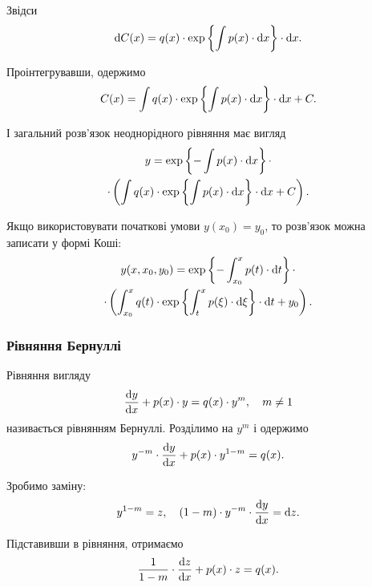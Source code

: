 Звідси
\begin{equation*} 
	\mathop{}\!\mathrm{d} C(x) = q(x) \cdot \exp \left\{\int p(x) \cdot \mathop{}\!\mathrm{d} x \right\} \cdot \mathop{}\!\mathrm{d} x.
\end{equation*}

Проінтегрувавши, одержимо
\begin{equation*} 
	C(x) = \int q(x) \cdot \exp \left\{\int p(x) \cdot \mathop{}\!\mathrm{d} x \right\} \cdot \mathop{}\!\mathrm{d} x + C.
\end{equation*}

І загальний розв’язок неоднорідного рівняння має вигляд
\begin{multline*} 
	y = \exp \left\{ - \int p(x) \cdot \mathop{}\!\mathrm{d} x \right\} \cdot \\
	\cdot \left( \int q(x) \cdot \exp \left\{\int p(x) \cdot \mathop{}\!\mathrm{d} x \right\} \cdot \mathop{}\!\mathrm{d} x + C\right).
\end{multline*}

Якщо використовувати початкові умови $y(x_0) = y_0$, то розв’язок можна записати у формі Коші:
\begin{multline*} 
	y(x, x_0, y_0) = \exp \left\{ - \int_{x_0}^x p(t) \cdot \mathop{}\!\mathrm{d} t \right\} \cdot \\
	\cdot \left( \int_{x_0}^x q(t) \cdot \exp \left\{\int_t^x p(\xi) \cdot \mathop{}\!\mathrm{d} \xi \right\} \cdot \mathop{}\!\mathrm{d} t + y_0\right).
\end{multline*}

\subsubsection{Рівняння Бернуллі}

Рівняння вигляду
\begin{equation*}
	\frac{\mathop{}\!\mathrm{d} y}{\mathop{}\!\mathrm{d} x} + p(x) \cdot y = q(x) \cdot y^m, \quad m \ne 1
\end{equation*}
називається рівнянням Бернуллі. Розділимо на $y^m$ і одержимо 
\begin{equation*}
	y^{-m} \cdot \frac{\mathop{}\!\mathrm{d} y}{\mathop{}\!\mathrm{d} x} + p(x) \cdot y^{1-m} = q(x).
\end{equation*}

Зробимо заміну: 
\begin{equation*}
	y^{1-m} = z, \quad (1 - m) \cdot y^{-m} \cdot \frac{\mathop{}\!\mathrm{d} y}{\mathop{}\!\mathrm{d} x} = \mathop{}\!\mathrm{d} z.
\end{equation*}

Підставивши в рівняння, отримаємо
\begin{equation*}
	\frac{1}{1-m} \cdot \frac{\mathop{}\!\mathrm{d} z}{\mathop{}\!\mathrm{d} x} + p(x) \cdot z = q(x).
\end{equation*}

